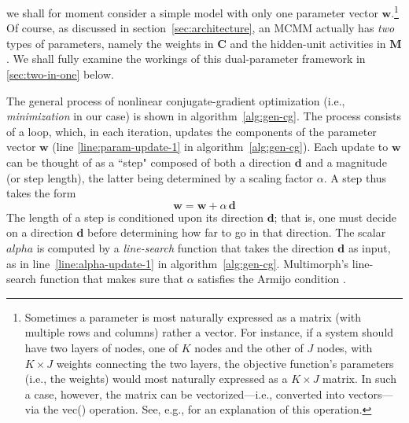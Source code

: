 we shall for moment consider a simple model with only one parameter 
vector $\textbf{w}$.\footnote{Sometimes a parameter is most naturally expressed as a matrix (with multiple rows and columns) rather a vector. For instance, if a system should have two layers of nodes, one of $K$ nodes and the other of $J$ nodes, with $K \times J$ weights connecting the two layers, the objective function's parameters (i.e., the weights) would most naturally expressed as a  $K \times J$ matrix. In such a case, however, the matrix can be vectorized---i.e., converted into vectors---via the \textsf{vec()} operation. See, e.g., \citet{fackler:2005} for an explanation of this operation.} %
Of course, as discussed in section~\ref{sec:architecture},
an MCMM actually has \emph{two} types of parameters, namely
the weights in $\textbf{C}$ and the hidden-unit activities in $\textbf{M}$. 
We shall fully examine the workings of this dual-parameter framework in \ref{sec:two-in-one} below.

The general process of nonlinear conjugate-gradient optimization 
(i.e., \emph{minimization} in our case)
is shown in algorithm~\ref{alg:gen-cg}. The process consists of a loop, 
which, in each iteration, updates the components of the parameter 
vector $\textbf{w}$ (line \ref{line:param-update-1} in algorithm~\ref{alg:gen-cg}).
Each update to $\textbf{w}$ can be thought of 
as a ``step" composed of both a direction $\textbf{d}$ and a magnitude (or step length), 
the latter being determined by a scaling factor $\alpha$. A step thus takes the form
\begin{equation}\label{eq:gen-update}
\textbf{w} = \textbf{w} + \alpha \, \textbf{d}
\end{equation}
The length of a step is conditioned upon its direction $\textbf{d}$; 
that is, one must decide on a direction $\textbf{d}$ before 
determining how far to go in that direction.
The scalar $alpha$ is computed by a \emph{line-search} function 
that takes the direction $\textbf{d}$
as input, as in line~\ref{line:alpha-update-1} in algorithm~\ref{alg:gen-cg}.
Multimorph's line-search function that makes sure that $\alpha$ satisfies the
Armijo condition \citep{armijo:1966}. %

